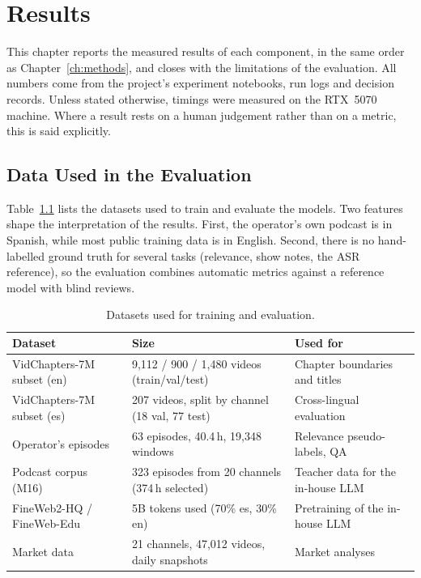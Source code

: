 \chapter{Results}
\label{ch:results}

This chapter reports the measured results of each component, in the same order as Chapter~\ref{ch:methods}, and closes with the limitations of the evaluation. All numbers come from the project's experiment notebooks, run logs and decision records. Unless stated otherwise, timings were measured on the RTX~5070 machine. Where a result rests on a human judgement rather than on a metric, this is said explicitly.

\section{Data Used in the Evaluation}

Table~\ref{tab:datasets} lists the datasets used to train and evaluate the models. Two features shape the interpretation of the results. First, the operator's own podcast is in Spanish, while most public training data is in English. Second, there is no hand-labelled ground truth for several tasks (relevance, show notes, the ASR reference), so the evaluation combines automatic metrics against a reference model with blind reviews.

\begin{table}[H]
\centering
\caption{Datasets used for training and evaluation.}
\label{tab:datasets}
\small
\begin{tabular}{@{}p{4.2cm}p{5.4cm}p{4.6cm}@{}}
\toprule
\textbf{Dataset} & \textbf{Size} & \textbf{Used for} \\
\midrule
VidChapters-7M subset (en) & 9{,}112 / 900 / 1{,}480 videos (train/val/test) & Chapter boundaries and titles \\
VidChapters-7M subset (es) & 207 videos, split by channel (18 val, 77 test) & Cross-lingual evaluation \\
Operator's episodes & 63 episodes, 40.4\,h, 19{,}348 windows & Relevance pseudo-labels, QA \\
Podcast corpus (M16) & 323 episodes from 20 channels (374\,h selected) & Teacher data for the in-house LLM \\
FineWeb2-HQ / FineWeb-Edu & 5B tokens used (70\% es, 30\% en) & Pretraining of the in-house LLM \\
Market data & 21 channels, 47{,}012 videos, daily snapshots & Market analyses \\
\bottomrule
\end{tabular}
\end{table}

